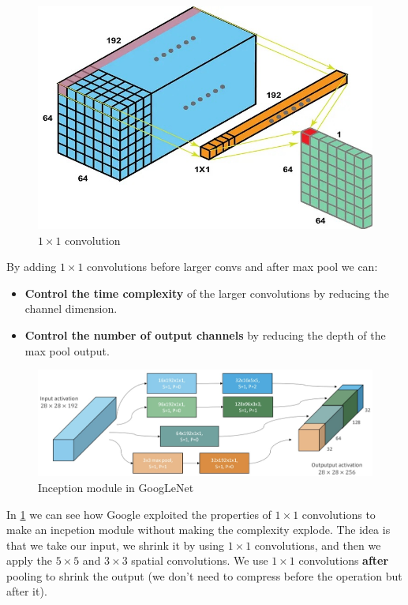 \documentclass{article}
\begin{document}
\begin{figure}[htbp]
  \centering
  \includegraphics[width=0.8\linewidth]{./img/11conv.jpg}
  \caption{$1 \times 1$ convolution}
\end{figure}

By adding $1\times 1$ convolutions before larger convs and after max pool we can:
\begin{itemize}
  \item \textbf{Control the time complexity} of the larger convolutions by reducing the channel dimension.
  \item \textbf{Control the number of output channels} by reducing the depth of the max pool output.
\end{itemize}

\begin{figure}[htbp]
  \centering
  \includegraphics[width=0.8\linewidth]{./img/inception.jpg}
  \caption{Inception module in GoogLeNet}
  \label{fig:inception}
\end{figure}

In \ref{fig:inception} we can see how Google exploited the properties of $1\times 1$ convolutions to make an incpetion module without making the complexity explode.
The idea is that we take our input, we shrink it by using $1\times 1$ convolutions, and then we apply the $5 \times 5$ and $3 \times 3$ spatial convolutions.
We use $1\times 1$ convolutions \textbf{after} pooling to shrink the output (we don't need to compress before the operation but after it).
\end{document}
